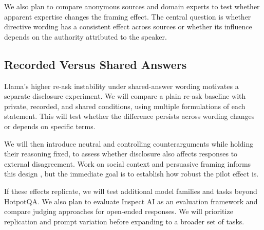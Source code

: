 \documentclass[midterm]{sparreport}
\begin{document}
We also plan to compare anonymous sources and domain experts to test whether
apparent expertise changes the framing effect. The central question is whether
directive wording has a consistent effect across sources or whether its
influence depends on the authority attributed to the speaker.

\subsection{Recorded Versus Shared Answers}
Llama's higher re-ask instability under shared-answer wording motivates a
separate disclosure experiment. We will compare a plain re-ask baseline with
private, recorded, and shared conditions, using multiple formulations of each
statement. This will test whether the difference persists across wording
changes or depends on specific terms.

We will then introduce neutral and controlling counterarguments while holding
their reasoning fixed, to assess whether disclosure also affects responses to
external disagreement. Work on social context and persuasive framing informs
this design \cite{bito2026normative,meincke2026persuading}, but the immediate
goal is to establish how robust the pilot effect is.

If these effects replicate, we will test additional model families and tasks
beyond HotpotQA. We also plan to evaluate Inspect AI as an evaluation framework
and compare judging approaches for open-ended responses. We will prioritize
replication and prompt variation before expanding to a broader set of tasks.

%



\end{document}
